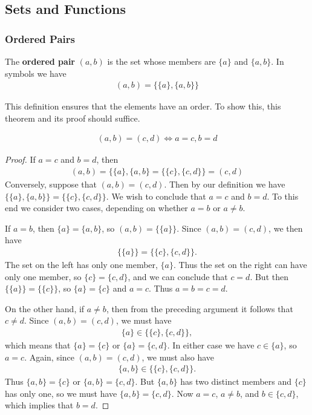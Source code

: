 \subsection{Sets and Functions}

\subsubsection{Ordered Pairs}

\begin{definition}
	The \textbf{ordered pair} $(a,b)$ is the set whose members are $\{a\}$ and $\{a,b\}$. In symbols we have
	\begin{align*}
		(a,b) = \{\{a\}, \{a,b\}\}
	\end{align*}
\end{definition}

This definition ensures that the elements have an order. To show this, this theorem and its proof should suffice.

\begin{theorem}
	\begin{align*}
		(a,b)=(c,d) \Leftrightarrow a=c, b=d
	\end{align*}
\end{theorem}
\begin{proof}
	If $a=c$ and $b=d$, then 
	\begin{align*}
		(a,b)=\{\{a\}, \{a,b\} = \{\{c\}, \{c,d\}\}=(c,d)
	\end{align*}
	Conversely, suppose that $(a,b)=(c,d)$. Then by our definition we have $\{\{a\}, \{a,b\}\} = \{\{c\}, \{c,d\}\}$. We wish to conclude that $a=c$ and $b=d$. To this end we consider two cases, depending on whether $a=b$ or $a\neq b$.
	
	If $a=b$, then $\{a\} = \{a,b\}$, so $(a,b) = \{\{a\}\}$. Since $(a,b)=(c,d)$, we then have 
	\begin{align*}
		\{\{a\}\} = \{\{c\}, \{c,d\}\}.
	\end{align*}
	The set on the left has only one member, $\{a\}$. Thus the set on the right can have only one member, so $\{c\} = \{c,d\}$, and we can conclude that $c=d$. But then $\{\{a\}\} = \{\{c\}\}$, so $\{a\} = \{c\}$ and $a=c$. Thus $a=b=c=d$.
	
	On the other hand, if $a\neq b$, then from the preceding argument it follows that $c\neq d$. Since $(a,b) = (c,d)$, we must have 
	\begin{align*}
		\{a\} \in \{\{c\}, \{c,d\}\},
	\end{align*}
	which means that $\{a\} = \{c\}$ or $\{a\} = \{c,d\}$. In either case we have $c \in \{a\}$, so $a=c$. Again, since $(a,b)=(c,d)$, we must also have
	\begin{align*}
		\{a,b\} \in \{\{c\}, \{c,d\}\}.
	\end{align*}
	Thus $\{a,b\} = \{c\}$ or $\{a,b\} = \{c,d\}$. But $\{a,b\}$ has two distinct members and $\{c\}$ has only one, so we must have $\{a,b\} = \{c,d\}$. Now $a=c$, $a\neq b$, and $b\in \{c,d\}$, which implies that $b=d$. 
\end{proof}

